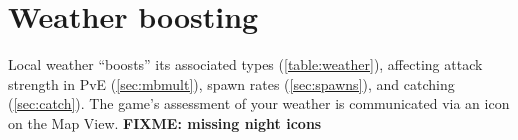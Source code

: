 \section{Weather boosting}
\label{sec:weather}
Local weather ``boosts'' its associated types (\autoref{table:weather}), affecting attack strength
 in PvE (\autoref{sec:mbmult}),
 spawn rates (\autoref{sec:spawns}), and catching (\autoref{sec:catch}).
The game's assessment of your weather is communicated via an icon on the Map View.
\textbf{FIXME: missing night icons}
\begin{table}[ht]
  
\end{table}
